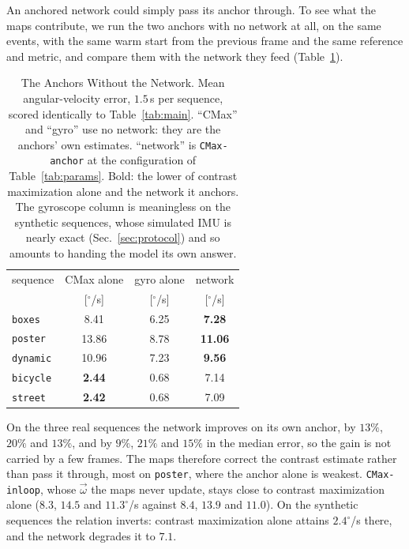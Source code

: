 \documentclass[journal]{IEEEtran}
\newcommand{\wvec}{\vec{\omega}}
\begin{document}
An anchored network could simply pass its anchor through. To see what the maps contribute, we run the two anchors with no network at all, on the same events, with the same warm start from the previous frame and the same reference and metric, and compare them with the network they feed (Table~\ref{tab:baseline}).

\begin{table}[!t]
\renewcommand{\arraystretch}{1.15}
\caption{The Anchors Without the Network. \textnormal{Mean angular-velocity
error, $1.5$\,s per sequence, scored identically to Table~\ref{tab:main}.
``CMax'' and ``gyro'' use no network: they are the anchors' own estimates.
``network'' is \texttt{CMax-anchor} at the configuration of
Table~\ref{tab:params}. Bold: the lower of contrast maximization alone and
the network it anchors. The gyroscope column is meaningless on the synthetic
sequences, whose simulated IMU is nearly exact (Sec.~\ref{sec:protocol}) and so
amounts to handing the model its own answer.}}
\label{tab:baseline}
\centering
\footnotesize
\begin{tabular}{@{}lccc@{}}
\toprule
sequence & CMax alone & gyro alone & network \\
 & [$^\circ$/s] & [$^\circ$/s] & [$^\circ$/s] \\
\midrule
\texttt{boxes}   &  8.41 & 6.25 & \textbf{7.28} \\
\texttt{poster}  & 13.86 & 8.78 & \textbf{11.06} \\
\texttt{dynamic} & 10.96 & 7.23 & \textbf{9.56} \\
\midrule
\texttt{bicycle} & \textbf{2.44} & 0.68 & 7.14 \\
\texttt{street}  & \textbf{2.42} & 0.68 & 7.09 \\
\bottomrule
\end{tabular}
\end{table}

On the three real sequences the network improves on its own anchor, by $13\%$, $20\%$ and $13\%$, and by $9\%$, $21\%$ and $15\%$ in the median error, so the gain is not carried by a few frames. The maps therefore correct the contrast estimate rather than pass it through, most on \texttt{poster}, where the anchor alone is weakest. \texttt{CMax-inloop}, whose $\wvec$ the maps never update, stays close to contrast maximization alone ($8.3$, $14.5$ and $11.3^\circ$/s against $8.4$, $13.9$ and $11.0$). On the synthetic sequences the relation inverts: contrast maximization alone attains $2.4^\circ$/s there, and the network degrades it to $7.1$.
\end{document}
